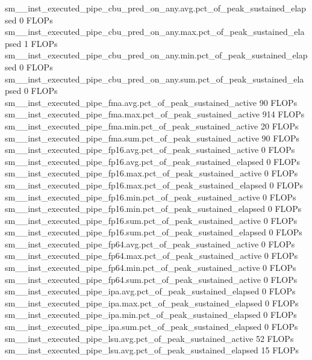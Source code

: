 sm__inst_executed_pipe_cbu_pred_on_any.avg.pct_of_peak_sustained_elapsed                       0 FLOPs
sm__inst_executed_pipe_cbu_pred_on_any.max.pct_of_peak_sustained_elapsed                       1 FLOPs
sm__inst_executed_pipe_cbu_pred_on_any.min.pct_of_peak_sustained_elapsed                       0 FLOPs
sm__inst_executed_pipe_cbu_pred_on_any.sum.pct_of_peak_sustained_elapsed                       0 FLOPs
sm__inst_executed_pipe_fma.avg.pct_of_peak_sustained_active                                   90 FLOPs
sm__inst_executed_pipe_fma.max.pct_of_peak_sustained_active                                  914 FLOPs
sm__inst_executed_pipe_fma.min.pct_of_peak_sustained_active                                   20 FLOPs
sm__inst_executed_pipe_fma.sum.pct_of_peak_sustained_active                                   90 FLOPs
sm__inst_executed_pipe_fp16.avg.pct_of_peak_sustained_active                                   0 FLOPs
sm__inst_executed_pipe_fp16.avg.pct_of_peak_sustained_elapsed                                  0 FLOPs
sm__inst_executed_pipe_fp16.max.pct_of_peak_sustained_active                                   0 FLOPs
sm__inst_executed_pipe_fp16.max.pct_of_peak_sustained_elapsed                                  0 FLOPs
sm__inst_executed_pipe_fp16.min.pct_of_peak_sustained_active                                   0 FLOPs
sm__inst_executed_pipe_fp16.min.pct_of_peak_sustained_elapsed                                  0 FLOPs
sm__inst_executed_pipe_fp16.sum.pct_of_peak_sustained_active                                   0 FLOPs
sm__inst_executed_pipe_fp16.sum.pct_of_peak_sustained_elapsed                                  0 FLOPs
sm__inst_executed_pipe_fp64.avg.pct_of_peak_sustained_active                                   0 FLOPs
sm__inst_executed_pipe_fp64.max.pct_of_peak_sustained_active                                   0 FLOPs
sm__inst_executed_pipe_fp64.min.pct_of_peak_sustained_active                                   0 FLOPs
sm__inst_executed_pipe_fp64.sum.pct_of_peak_sustained_active                                   0 FLOPs
sm__inst_executed_pipe_ipa.avg.pct_of_peak_sustained_elapsed                                   0 FLOPs
sm__inst_executed_pipe_ipa.max.pct_of_peak_sustained_elapsed                                   0 FLOPs
sm__inst_executed_pipe_ipa.min.pct_of_peak_sustained_elapsed                                   0 FLOPs
sm__inst_executed_pipe_ipa.sum.pct_of_peak_sustained_elapsed                                   0 FLOPs
sm__inst_executed_pipe_lsu.avg.pct_of_peak_sustained_active                                   52 FLOPs
sm__inst_executed_pipe_lsu.avg.pct_of_peak_sustained_elapsed                                  15 FLOPs
